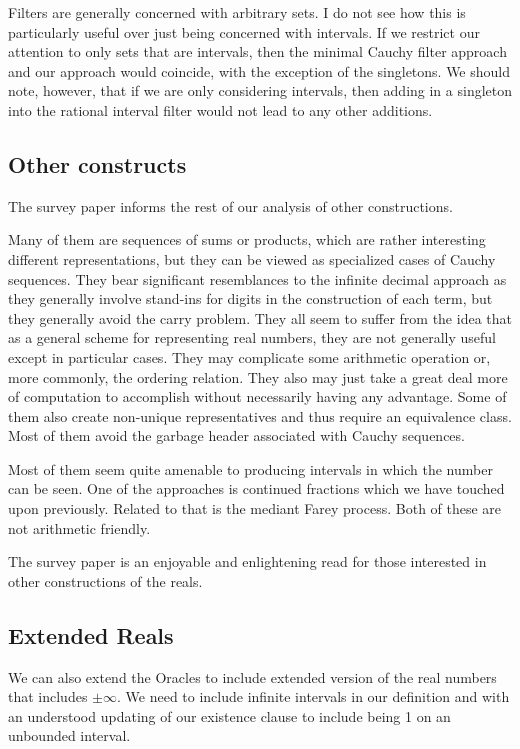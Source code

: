 \documentclass[12pt]{article}
\theoremstyle{remark}
\begin{document}
Filters are generally concerned with arbitrary sets. I do not see how this is particularly useful over just being concerned with intervals. If we restrict our attention to only sets that are intervals, then the minimal Cauchy filter approach and our approach would coincide, with the exception of the singletons. We should note, however, that if we are only considering intervals, then adding in a singleton into the rational interval filter would not lead to any other additions.

\subsection{Other constructs}

The survey paper \cite{ittay-2015} informs the rest of our analysis of other constructions. 

Many of them are sequences of sums or products, which are rather interesting different representations, but they can be viewed as specialized cases of Cauchy sequences. They bear significant resemblances to the infinite decimal approach as they generally involve stand-ins for digits in the construction of each term, but they generally avoid the carry problem. They all seem to suffer from the idea that as a general scheme for representing real numbers, they are not generally useful except in particular cases. They may complicate some arithmetic operation or, more commonly, the ordering relation. They also may just take a great deal more of computation to accomplish without necessarily having any advantage. Some of them also create non-unique representatives and thus require an equivalence class. Most of them avoid the garbage header associated with Cauchy sequences. 

Most of them seem quite amenable to producing intervals in which the number can be seen. One of the approaches is continued fractions which we have touched upon previously. Related to that is the mediant Farey process. Both of these are not arithmetic friendly. 

The survey paper is an enjoyable and enlightening read for those interested in other constructions of the reals. 

\subsection{Extended Reals}

We can also extend the Oracles to include extended version of the real numbers that includes $\pm \infty$. We need to include infinite intervals in our definition and with an understood updating of our existence clause to include being 1 on an unbounded interval.
\end{document}

